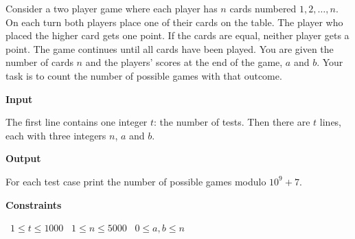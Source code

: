 Consider a two player game where each player has $n$ cards numbered $1,2,\dots,n$. On each turn both players place one of their cards on the table. The player who placed the higher card gets one point. If the cards are equal, neither player gets a point. The game continues until all cards have been played.
You are given the number of cards $n$ and the players' scores at the end of the game, $a$ and $b$. Your task is to count the number of possible games with that outcome.

\vspace{0.3cm}\noindent\textbf{Input}

The first line contains one integer $t$: the number of tests.
Then there are $t$ lines, each with three integers $n$, $a$ and $b$.

\vspace{0.3cm}\noindent\textbf{Output}

For each test case print the number of possible games modulo $10^9+7$.

\vspace{0.3cm}\noindent\textbf{Constraints}

\textbullet\ $1 \le t \le 1000$
\textbullet\ $1 \le n \le 5000$
\textbullet\ $0 \le a,b \le n$